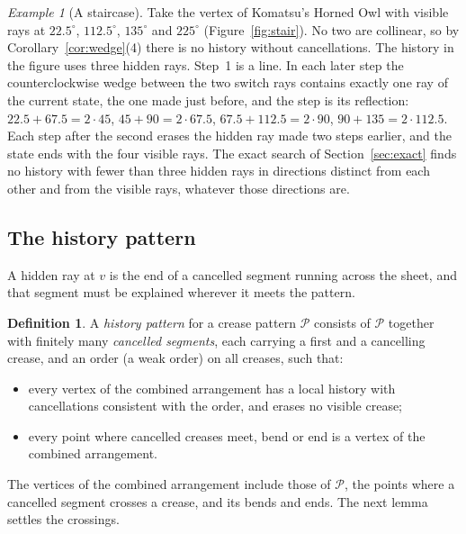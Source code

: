 \documentclass[11pt]{article}
\theoremstyle{definition}
\newtheorem{definition}[theorem]{Definition}
\theoremstyle{remark}
\newtheorem{example}[theorem]{Example}
\begin{document}
\begin{example}[A staircase]\label{ex:stair}
Take the vertex of Komatsu's Horned Owl with visible rays at $22.5^\circ$, $112.5^\circ$, $135^\circ$ and $225^\circ$ (Figure~\ref{fig:stair}). No two are collinear, so by Corollary~\ref{cor:wedge}(4) there is no history without cancellations. The history in the figure uses three hidden rays. Step~1 is a line. In each later step the counterclockwise wedge between the two switch rays contains exactly one ray of the current state, the one made just before, and the step is its reflection: $22.5+67.5=2\cdot45$, $45+90=2\cdot67.5$, $67.5+112.5=2\cdot90$, $90+135=2\cdot112.5$. Each step after the second erases the hidden ray made two steps earlier, and the state ends with the four visible rays. The exact search of Section~\ref{sec:exact} finds no history with fewer than three hidden rays in directions distinct from each other and from the visible rays, whatever those directions are.
\end{example}

\subsection{The history pattern}

A hidden ray at $v$ is the end of a cancelled segment running across the sheet, and that segment must be explained wherever it meets the pattern.

\begin{definition}\label{def:historypattern}
A \emph{history pattern} for a crease pattern $\mathcal P$ consists of $\mathcal P$ together with finitely many \emph{cancelled segments}, each carrying a first and a cancelling crease, and an order (a weak order) on all creases, such that:
\begin{itemize}
\item every vertex of the combined arrangement has a local history with cancellations consistent with the order, and erases no visible crease;
\item every point where cancelled creases meet, bend or end is a vertex of the combined arrangement.
\end{itemize}
\end{definition}

The vertices of the combined arrangement include those of $\mathcal P$, the points where a cancelled segment crosses a crease, and its bends and ends. The next lemma settles the crossings.
\end{document}
